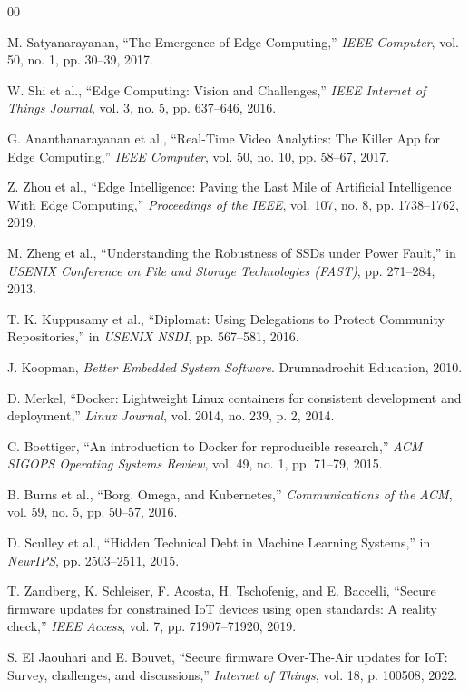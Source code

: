 \documentclass[conference]{IEEEtran}
\begin{document}
\begin{thebibliography}{00}

 M. Satyanarayanan, ``The Emergence of Edge Computing,'' \textit{IEEE Computer}, vol. 50, no. 1, pp. 30--39, 2017.

 W. Shi et al., ``Edge Computing: Vision and Challenges,'' \textit{IEEE Internet of Things Journal}, vol. 3, no. 5, pp. 637--646, 2016.

 G. Ananthanarayanan et al., ``Real-Time Video Analytics: The Killer App for Edge Computing,'' \textit{IEEE Computer}, vol. 50, no. 10, pp. 58--67, 2017.

 Z. Zhou et al., ``Edge Intelligence: Paving the Last Mile of Artificial Intelligence With Edge Computing,'' \textit{Proceedings of the IEEE}, vol. 107, no. 8, pp. 1738--1762, 2019.

 M. Zheng et al., ``Understanding the Robustness of SSDs under Power Fault,'' in \textit{USENIX Conference on File and Storage Technologies (FAST)}, pp. 271--284, 2013.

 T. K. Kuppusamy et al., ``Diplomat: Using Delegations to Protect Community Repositories,'' in \textit{USENIX NSDI}, pp. 567--581, 2016.

 J. Koopman, \textit{Better Embedded System Software}. Drumnadrochit Education, 2010.

 D. Merkel, ``Docker: Lightweight Linux containers for consistent development and deployment,'' \textit{Linux Journal}, vol. 2014, no. 239, p. 2, 2014.

 C. Boettiger, ``An introduction to Docker for reproducible research,'' \textit{ACM SIGOPS Operating Systems Review}, vol. 49, no. 1, pp. 71--79, 2015.

 B. Burns et al., ``Borg, Omega, and Kubernetes,'' \textit{Communications of the ACM}, vol. 59, no. 5, pp. 50--57, 2016.

 D. Sculley et al., ``Hidden Technical Debt in Machine Learning Systems,'' in \textit{NeurIPS}, pp. 2503--2511, 2015.

 T. Zandberg, K. Schleiser, F. Acosta, H. Tschofenig, and E. Baccelli, ``Secure firmware updates for constrained IoT devices using open standards: A reality check,'' \textit{IEEE Access}, vol. 7, pp. 71907--71920, 2019.

 S. El Jaouhari and E. Bouvet, ``Secure firmware Over-The-Air updates for IoT: Survey, challenges, and discussions,'' \textit{Internet of Things}, vol. 18, p. 100508, 2022.


\end{thebibliography}
\end{document}
